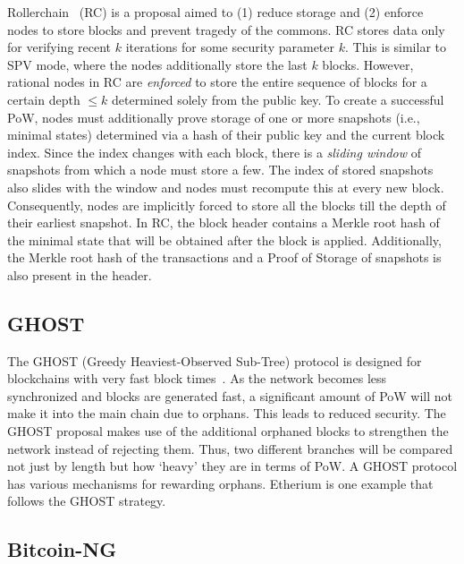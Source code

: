 \documentclass[]{report}   %
\newcommand{\authnote}[2]{\marginpar{\parbox{\marginparwidth}{\tiny %
  \textsf{#1 {\textcolor{blue}{notes: #2}}}}}%
  \textcolor{blue}{\textbf{\dag}}}
\newcommand{\authnote}[2]{
  \textsf{#1 \textcolor{blue}{: #2}}}
\newcommand{\authnote}[2]{}
\newcommand{\anote}[1]{{\authnote{\textcolor{red}{asc9 notes}}{#1}}}
\begin{document}
Rollerchain~\cite{DBLP:journals/corr/ChepurnoyLO16} (RC) is a proposal aimed to (1) reduce storage and (2) enforce nodes to store blocks and prevent tragedy of the commons. RC stores data only for verifying recent $k$ iterations for some security parameter $k$. This is similar to SPV mode, where the nodes additionally store the last $k$ blocks. However, rational nodes in RC are {\em enforced} to store the entire sequence of blocks for a certain depth $\leq k$ determined solely from the public key. To create a successful PoW, nodes must additionally prove storage of one or more snapshots (i.e., minimal states) determined via a hash of their public key and the current block index. Since the index changes with each block, there is a {\em sliding window} of snapshots from which a node must store a few. The index of stored snapshots also slides with the window and nodes must recompute this at every new block. Consequently, nodes are implicitly forced to store all the blocks till the depth of their earliest snapshot.
In RC, the block header contains a Merkle root hash of the minimal state that will be obtained after the block is applied. Additionally, the Merkle root hash of the transactions and a Proof of Storage of snapshots is also present in the header. 

\anote{Not very clear to me how the Proof of storage works -- Alex, please add some text.}


\subsection{GHOST}

The GHOST (Greedy Heaviest-Observed Sub-Tree) protocol is designed for blockchains with very fast block times~\cite{cryptoeprint:2013:881}. As the network becomes less synchronized and blocks are generated fast, a significant amount of PoW will not make it into the main chain due to orphans. This leads to reduced security. The GHOST proposal makes use of the additional orphaned blocks to strengthen the network instead of rejecting them. Thus, two different branches will be compared not just by length but how `heavy' they are in terms of PoW. A GHOST protocol has various mechanisms for rewarding orphans. Etherium is one example that follows the GHOST strategy.

\subsection{Bitcoin-NG}
\end{document}
